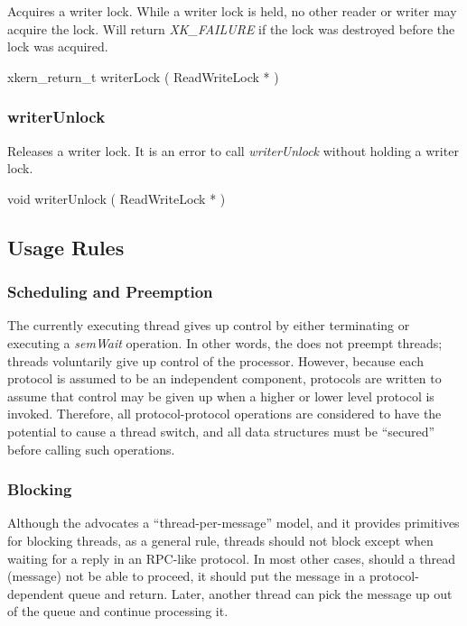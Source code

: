 Acquires a writer lock.  While a writer lock is held, no other reader
or writer may acquire the lock.  
Will return {\em XK\_FAILURE} if the lock was destroyed before
the lock was acquired.

\medskip
{\sem xkern\_return\_t} {\bold writerLock} ( {\sem ReadWriteLock} * )


\subsubsection{writerUnlock}

Releases a writer lock.  It is an error to call {\em writerUnlock}
without holding a writer lock.

\medskip
{\sem void} {\bold writerUnlock} ( {\sem ReadWriteLock} * )



\subsection{Usage Rules}

\subsubsection{Scheduling and Preemption}

The currently executing thread gives up control by either terminating
or executing a {\em semWait} operation.  In other words, the \xk{}
does not preempt threads; threads voluntarily give up control of the
processor.  However, because each protocol is assumed to be an
independent component, protocols are written to assume that control
may be given up when a higher or lower level protocol is invoked.
Therefore, all protocol-protocol operations are considered to have the
potential to cause a thread switch, and all data structures must be
``secured'' before calling such operations.

\subsubsection{Blocking}

Although the \xk{} advocates a ``thread-per-message'' model, and it
provides primitives for blocking threads, as a general rule, threads
should not block except when waiting for a reply in an RPC-like
protocol. In most other cases, should a thread (message) not be able
to proceed, it should put the message in a protocol-dependent queue
and return. Later, another thread can pick the message up out of the
queue and continue processing it.

